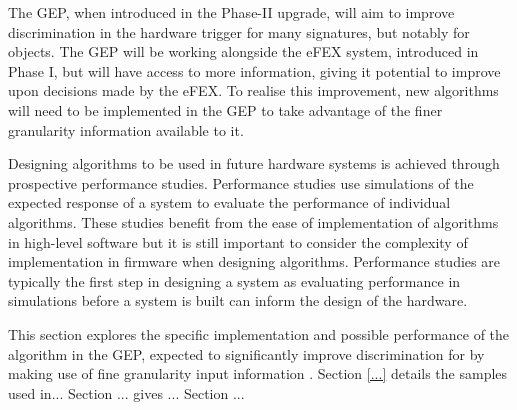 
The \ac{GEP}, when introduced in the Phase-II upgrade, will aim to improve
discrimination in the hardware trigger for many signatures, but notably for
\egamma objects. The \ac{GEP} will be working alongside the \ac{eFEX} system,
introduced in Phase I, but will have access to more information, giving it
potential to improve upon decisions made by the \ac{eFEX}. To realise this
improvement, new algorithms will need to be implemented in the \ac{GEP} to take
advantage of the finer granularity information available to it.

Designing algorithms to be used in future hardware systems is achieved through
prospective performance studies. Performance studies use simulations of the
expected response of a system to evaluate the performance of individual
algorithms. These studies benefit from the ease of implementation of algorithms
in high-level software but it is still important to consider the complexity of
implementation in firmware when designing algorithms. Performance studies are
typically the first step in designing a system as evaluating performance in
simulations before a system is built can inform the design of the hardware.

This section explores the specific implementation and possible performance of
the \eratio algorithm in the \ac{GEP}, expected to significantly improve
discrimination for \egamma by making use of fine granularity input information
\cite[p.~126]{CERN-LHCC-2017-020}.
%
Section \ref{...} details the samples used in...
Section ... gives ...
Section ...
